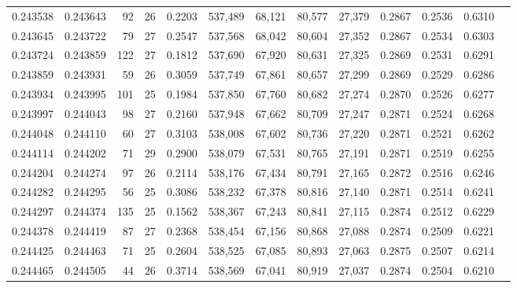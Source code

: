 \begin{tabular}{rrrrrrrrrrrrr}
0.243538 & 0.243643 &  92 &  26 &                                     0.2203 & 537,489 &  68,121 &  80,577 &  27,379 & 0.2867 & 0.2536 & 0.6310 \\
0.243645 & 0.243722 &  79 &  27 &                                     0.2547 & 537,568 &  68,042 &  80,604 &  27,352 & 0.2867 & 0.2534 & 0.6303 \\
0.243724 & 0.243859 & 122 &  27 &                                     0.1812 & 537,690 &  67,920 &  80,631 &  27,325 & 0.2869 & 0.2531 & 0.6291 \\
0.243859 & 0.243931 &  59 &  26 &                                     0.3059 & 537,749 &  67,861 &  80,657 &  27,299 & 0.2869 & 0.2529 & 0.6286 \\
0.243934 & 0.243995 & 101 &  25 &                                     0.1984 & 537,850 &  67,760 &  80,682 &  27,274 & 0.2870 & 0.2526 & 0.6277 \\
0.243997 & 0.244043 &  98 &  27 &                                     0.2160 & 537,948 &  67,662 &  80,709 &  27,247 & 0.2871 & 0.2524 & 0.6268 \\
0.244048 & 0.244110 &  60 &  27 &                                     0.3103 & 538,008 &  67,602 &  80,736 &  27,220 & 0.2871 & 0.2521 & 0.6262 \\
0.244114 & 0.244202 &  71 &  29 &                                     0.2900 & 538,079 &  67,531 &  80,765 &  27,191 & 0.2871 & 0.2519 & 0.6255 \\
0.244204 & 0.244274 &  97 &  26 &                                     0.2114 & 538,176 &  67,434 &  80,791 &  27,165 & 0.2872 & 0.2516 & 0.6246 \\
0.244282 & 0.244295 &  56 &  25 &                                     0.3086 & 538,232 &  67,378 &  80,816 &  27,140 & 0.2871 & 0.2514 & 0.6241 \\
0.244297 & 0.244374 & 135 &  25 &                                     0.1562 & 538,367 &  67,243 &  80,841 &  27,115 & 0.2874 & 0.2512 & 0.6229 \\
0.244378 & 0.244419 &  87 &  27 &                                     0.2368 & 538,454 &  67,156 &  80,868 &  27,088 & 0.2874 & 0.2509 & 0.6221 \\
0.244425 & 0.244463 &  71 &  25 &                                     0.2604 & 538,525 &  67,085 &  80,893 &  27,063 & 0.2875 & 0.2507 & 0.6214 \\
0.244465 & 0.244505 &  44 &  26 &                                     0.3714 & 538,569 &  67,041 &  80,919 &  27,037 & 0.2874 & 0.2504 & 0.6210 \\

\end{tabular}
